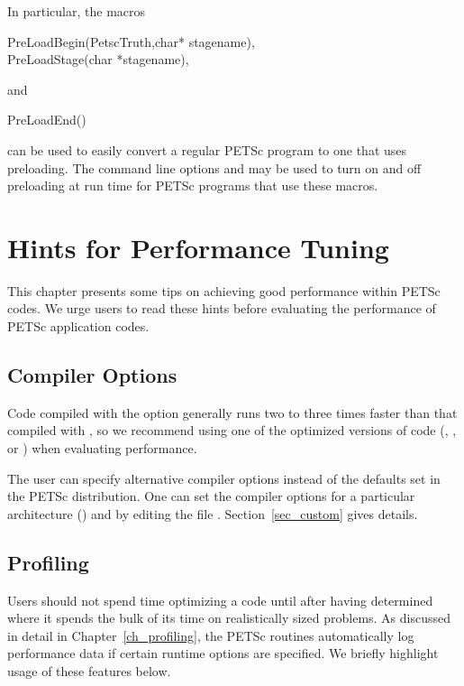 {{In particular, the macros 
\begin{tabbing}
  PreLoadBegin(PetscTruth,char* stagename),\\
  PreLoadStage(char *stagename),
\end{tabbing}
and 
\begin{tabbing}
  PreLoadEnd()
\end{tabbing}
can be used to easily 
convert a regular PETSc program to one that uses preloading. The command line options
  and   may be used to turn on and off
preloading at run time for PETSc programs that use these macros. 
  

\chapter{Hints for Performance Tuning} 
\label{ch_performance} 

This chapter presents some tips on achieving good performance within
PETSc codes.  We urge users to read these hints before
evaluating the performance of PETSc application codes.

\section{Compiler Options}

Code compiled with the  option generally runs two to three times
faster than that compiled with , so we recommend using one
of the optimized versions of code (, , or
) when evaluating performance.

The user can specify alternative compiler options instead of
the defaults set in the PETSc distribution.  One can set
the compiler options for a particular architecture
() and  by editing the file
.
Section~\ref{sec_custom} gives details.

\section{Profiling}
  

Users should not spend time optimizing a code until after having determined
where it spends the bulk of its time on realistically sized problems.
As discussed in detail in Chapter~\ref{ch_profiling}, the PETSc
routines automatically log performance data if certain runtime options
are specified.  We briefly highlight usage of these features below.

}}
